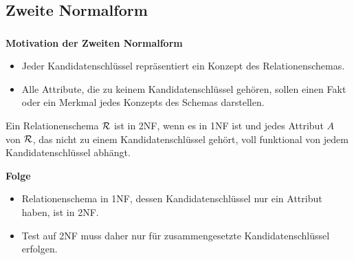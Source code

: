 \subsection{Zweite Normalform}

\begin{frame}[t]
\frametitle{\insertsection}
\framesubtitle{\insertsubsection}
\begin{block}{\textbf{Motivation der Zweiten Normalform}}
	\begin{itemize}
		\item Jeder Kandidatenschl\"ussel repr\"asentiert ein Konzept des Relationenschemas.
		\item Alle Attribute, die zu keinem Kandidatenschl\"ussel geh\"oren, sollen einen Fakt oder ein Merkmal 
		jedes Konzepts des Schemas darstellen.	
	\end{itemize}
\end{block}
\pause
\begin{definition}\label{def:2nf}
	Ein Relationenschema $\mathcal{R}$ ist in 2NF, wenn es in 1NF ist und jedes Attribut $A$ von $\mathcal{R}$, das nicht zu einem  
	Kandidatenschlüssel geh\"ort, voll funktional von jedem Kandidatenschlüssel abhängt.
\end{definition}
\pause
\begin{block}{\textbf{Folge}}
	\begin{itemize}
		\item Relationenschema in 1NF, dessen Kandidatenschl\"ussel nur ein Attribut haben, ist in 2NF.
		\item Test auf 2NF muss daher nur f\"ur zusammengesetzte Kandidatenschl\"ussel erfolgen.
	\end{itemize}
\end{block}
\end{frame}

